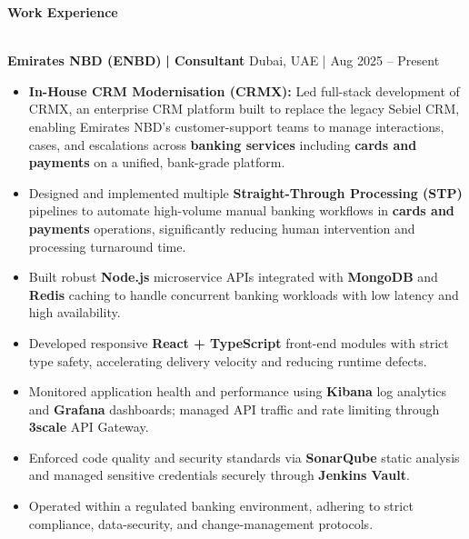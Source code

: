 \documentclass[a4paper]{article}
\newcommand{\lineunder} {
    \vspace*{-8pt} \\
    \hspace*{-18pt} \hrulefill \\
}
\newcommand{\header} [1] {
    {\hspace*{-18pt}\vspace*{6pt} \textbf{#1}}
    \vspace*{-6pt} \lineunder
}
\begin{document}
%
%
      \header{Work Experience}
      \vspace{2mm}

      \textbf{Emirates NBD (ENBD)} \textbf{ | Consultant} \hfill Dubai, UAE | Aug 2025 -- Present \\
          \vspace{-2mm}
\begin{itemize} \itemsep -3pt
\item \textbf{In-House CRM Modernisation (CRMX):} Led full-stack development of CRMX, an enterprise CRM platform built to replace the legacy Sebiel CRM, enabling Emirates NBD's customer-support teams to manage interactions, cases, and escalations across \textbf{banking services} including \textbf{cards and payments} on a unified, bank-grade platform.
\item Designed and implemented multiple \textbf{Straight-Through Processing (STP)} pipelines to automate high-volume manual banking workflows in \textbf{cards and payments} operations, significantly reducing human intervention and processing turnaround time.
\item Built robust \textbf{Node.js} microservice APIs integrated with \textbf{MongoDB} and \textbf{Redis} caching to handle concurrent banking workloads with low latency and high availability.
\item Developed responsive \textbf{React + TypeScript} front-end modules with strict type safety, accelerating delivery velocity and reducing runtime defects.
\item Monitored application health and performance using \textbf{Kibana} log analytics and \textbf{Grafana} dashboards; managed API traffic and rate limiting through \textbf{3scale} API Gateway.
\item Enforced code quality and security standards via \textbf{SonarQube} static analysis and managed sensitive credentials securely through \textbf{Jenkins Vault}.
\item Operated within a regulated banking environment, adhering to strict compliance, data-security, and change-management protocols.
\end{itemize}
\vspace{3mm}
\end{document}
